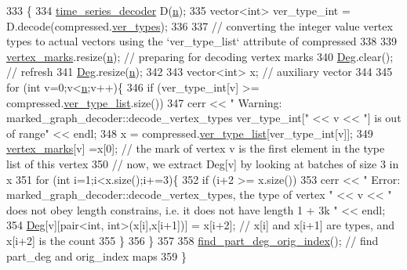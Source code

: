 \begin{DoxyCode}
333 \{
334   \hyperlink{classtime__series__decoder}{time\_series\_decoder} D(\hyperlink{classmarked__graph__decoder_aefc93611bc4a3e9a5d3956d97649a0e9}{n});
335   vector<int> ver\_type\_int = D.decode(compressed.\hyperlink{classmarked__graph__compressed_af446cc5e23c241a92b76642fd5ebc403}{ver\_types});
336 
337   \textcolor{comment}{// converting the integer value vertex types to actual vectors using the `ver\_type\_list` attribute of
       compressed}
338 
339   \hyperlink{classmarked__graph__decoder_a98be932a5abff7efbc8dd4290268b69a}{vertex\_marks}.resize(\hyperlink{classmarked__graph__decoder_aefc93611bc4a3e9a5d3956d97649a0e9}{n}); \textcolor{comment}{// preparing for decoding vertex marks}
340   \hyperlink{classmarked__graph__decoder_a5040ad86467693eab415f615408bfb9e}{Deg}.clear(); \textcolor{comment}{// refresh}
341   \hyperlink{classmarked__graph__decoder_a5040ad86467693eab415f615408bfb9e}{Deg}.resize(\hyperlink{classmarked__graph__decoder_aefc93611bc4a3e9a5d3956d97649a0e9}{n});
342 
343   vector<int> x; \textcolor{comment}{// auxiliary vector}
344 
345   \textcolor{keywordflow}{for} (\textcolor{keywordtype}{int} v=0;v<\hyperlink{classmarked__graph__decoder_aefc93611bc4a3e9a5d3956d97649a0e9}{n};v++)\{
346     \textcolor{keywordflow}{if} (ver\_type\_int[v] >= compressed.\hyperlink{classmarked__graph__compressed_af2e3e55223d436628a02758dfae88493}{ver\_type\_list}.size())
347       cerr << \textcolor{stringliteral}{" Warning: marked\_graph\_decoder::decode\_vertex\_types ver\_type\_int["} << v << \textcolor{stringliteral}{"] is out of
       range"} << endl;
348     x = compressed.\hyperlink{classmarked__graph__compressed_af2e3e55223d436628a02758dfae88493}{ver\_type\_list}[ver\_type\_int[v]];
349     \hyperlink{classmarked__graph__decoder_a98be932a5abff7efbc8dd4290268b69a}{vertex\_marks}[v] =x[0]; \textcolor{comment}{// the mark of vertex v is the first element in the type list of
       this vertex}
350     \textcolor{comment}{// now, we extract Deg[v] by looking at batches of size 3 in x}
351     \textcolor{keywordflow}{for} (\textcolor{keywordtype}{int} i=1;i<x.size();i+=3)\{
352       \textcolor{keywordflow}{if} (i+2 >= x.size())
353         cerr << \textcolor{stringliteral}{" Error: marked\_graph\_decoder::decode\_vertex\_types, the type of vertex "} << v << \textcolor{stringliteral}{" does not
       obey length constrains, i.e. it does not have length 1 + 3k "} << endl;
354           \hyperlink{classmarked__graph__decoder_a5040ad86467693eab415f615408bfb9e}{Deg}[v][pair<int, int>(x[i],x[i+1])] = x[i+2]; \textcolor{comment}{// x[i] and x[i+1] are types, and x[i+2] is the
       count}
355     \}
356   \}
357 
358   \hyperlink{classmarked__graph__decoder_a1e035914395d2a3a50064b758c478ffd}{find\_part\_deg\_orig\_index}(); \textcolor{comment}{// find part\_deg and orig\_index maps}
359 \}
\end{DoxyCode}
